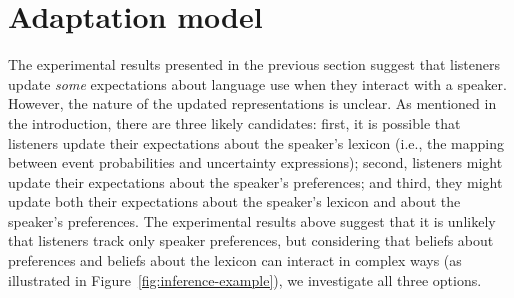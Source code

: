 \documentclass[man, floatsintext]{apa6}
\newcommand{\figref}[1]{Figure~\ref{#1}}
\begin{document}
\section{Adaptation model}
\label{sec:model-adapt}



The experimental results presented in the previous section suggest that listeners update
\textit{some} expectations about language use when they interact with a speaker. 
However, the nature of the updated representations is unclear. As mentioned in the introduction, there are three likely candidates:
first, it is possible that listeners update their expectations about the speaker's lexicon 
(i.e., the mapping between event probabilities and uncertainty expressions);  second, listeners
 might  update their expectations about the speaker's preferences; 
and third, they might update both their expectations about the speaker's lexicon 
and about the speaker's preferences. The experimental results above suggest that it is unlikely that listeners track only speaker preferences, but considering
that beliefs about preferences and beliefs about the lexicon can interact in complex ways (as illustrated in \figref{fig:inference-example}), we investigate all three options.
\end{document}
